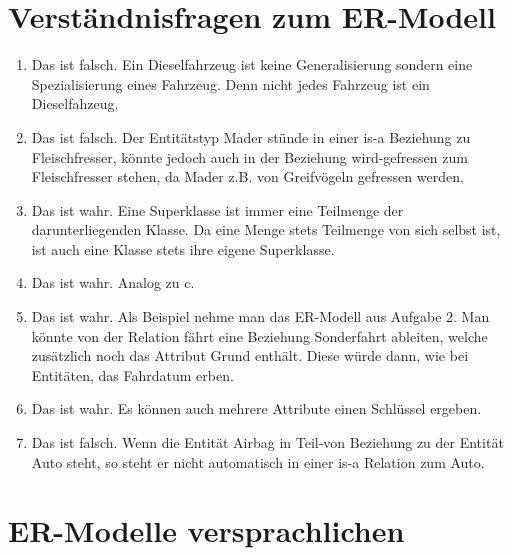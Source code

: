 \documentclass{scrartcl}
\begin{document}
\maketitle

\section{Verständnisfragen zum ER-Modell}
\begin{enumerate}
    \item Das ist falsch. Ein Dieselfahrzeug ist keine Generalisierung sondern eine Spezialisierung eines Fahrzeug. Denn nicht jedes Fahrzeug ist ein Dieselfahzeug. 
    \item Das ist falsch. Der Entitätstyp Mader stünde in einer is-a Beziehung zu Fleischfresser, könnte jedoch auch in der Beziehung wird-gefressen zum Fleischfresser stehen, da Mader z.B. von Greifvögeln gefressen werden.
    \item Das ist wahr. Eine Superklasse ist immer eine Teilmenge der darunterliegenden Klasse. Da eine Menge stets Teilmenge von sich selbst ist, ist auch eine Klasse stets ihre eigene Superklasse.
    \item Das ist wahr. Analog zu c.
    \item Das ist wahr. Als Beispiel nehme man das ER-Modell aus Aufgabe 2. Man könnte von der Relation fährt eine Beziehung Sonderfahrt ableiten, welche zusätzlich noch das Attribut Grund enthält. Diese würde dann, wie bei Entitäten, das Fahrdatum erben.
    \item Das ist wahr. Es können auch mehrere Attribute einen Schlüssel ergeben.
    \item Das ist falsch. Wenn die Entität Airbag in Teil-von Beziehung zu der Entität Auto steht, so steht er nicht automatisch in einer is-a Relation zum Auto.
\end{enumerate}

\section{ER-Modelle versprachlichen}
\end{document}
